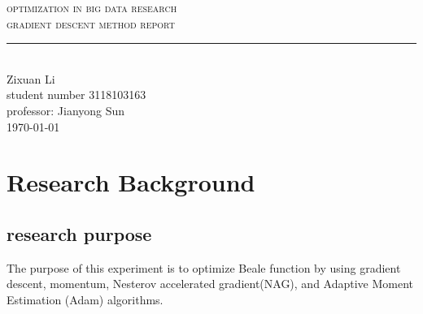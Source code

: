 \documentclass[aps,letterpaper,10pt]{article}
\newcommand{\labtitle}{gradient descent method report}
\newcommand{\authorname}{Zixuan Li}
\newcommand{\professor}{Jianyong Sun}
\newcommand{\classno}{3118103163}
\begin{document}


\begin{titlepage}
\begin{center}
{\LARGE \textsc{optimization in big data research} \\ \vspace{4pt}}
{\Large \textsc{\labtitle} \\ \vspace{4pt}}
\rule[13pt]{\textwidth}{1pt} \\ \vspace{150pt}
{\large  \authorname \\ \vspace{10pt}
student number \classno\\ \vspace{10pt}
professor: \professor \\ \vspace{10pt}
\today}
\end{center}
\end{titlepage}

\newpage
\tableofcontents

\newpage
\section{Research Background}
\subsection{research purpose}

The purpose of this experiment is to optimize Beale function by using gradient descent, momentum, Nesterov accelerated gradient(NAG), and Adaptive Moment Estimation (Adam) algorithms.\vspace{3mm}
\end{document}
